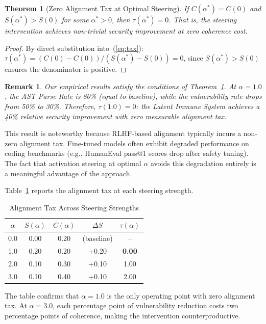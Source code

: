 \documentclass[journal, onecolumn]{IEEEtran}
\newtheorem{theorem}{Theorem}
\newtheorem{remark}{Remark}
\begin{document}
\begin{theorem}[Zero Alignment Tax at Optimal Steering]
\label{thm:tax}
If $C(\alpha^*) = C(0)$ and $S(\alpha^*) > S(0)$ for some $\alpha^* > 0$, then $\tau(\alpha^*) = 0$. That is, the steering intervention achieves non-trivial security improvement at zero coherence cost.
\end{theorem}
\begin{proof}
By direct substitution into~(\ref{eq:tax}): $\tau(\alpha^*) = (C(0) - C(0)) / (S(\alpha^*) - S(0)) = 0$, since $S(\alpha^*) > S(0)$ ensures the denominator is positive.
\end{proof}

\begin{remark}
Our empirical results satisfy the conditions of Theorem~\ref{thm:tax}. At $\alpha = 1.0$, the AST Parse Rate is 80\% (equal to baseline), while the vulnerability rate drops from 50\% to 30\%. Therefore, $\tau(1.0) = 0$: the Latent Immune System achieves a 40\% relative security improvement with zero measurable alignment tax.
\end{remark}

This result is noteworthy because RLHF-based alignment typically incurs a non-zero alignment tax. Fine-tuned models often exhibit degraded performance on coding benchmarks (e.g., HumanEval pass@1 scores drop after safety tuning). The fact that activation steering at optimal $\alpha$ avoids this degradation entirely is a meaningful advantage of the approach.

Table~\ref{tab:tax} reports the alignment tax at each steering strength.

\begin{table}[h]
\centering
\caption{Alignment Tax Across Steering Strengths}
\label{tab:tax}
\begin{tabular}{@{}ccccc@{}}
\toprule
$\alpha$ & $S(\alpha)$ & $C(\alpha)$ & $\Delta S$ & $\tau(\alpha)$ \\ \midrule
0.0 & 0.00 & 0.20 & (baseline) & -- \\
1.0 & 0.20 & 0.20 & +0.20 & \textbf{0.00} \\
2.0 & 0.10 & 0.30 & +0.10 & 1.00 \\
3.0 & 0.10 & 0.40 & +0.10 & 2.00 \\ \bottomrule
\end{tabular}
\end{table}

\noindent The table confirms that $\alpha = 1.0$ is the only operating point with zero alignment tax. At $\alpha = 3.0$, each percentage point of vulnerability reduction costs two percentage points of coherence, making the intervention counterproductive.
\end{document}
